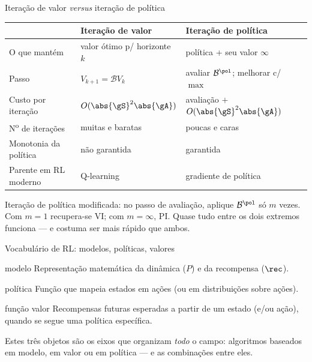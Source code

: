 \documentclass[aspectratio=169, 11pt]{beamer}
\newcommand{\Bop}{\mathcal{B}}                 %
\newcommand{\Bpol}{\mathcal{B}^{\pol}}         %
\begin{document}
\begin{frame}{Iteração de valor \emph{versus} iteração de política}
  \vspace{-0.3em}
  \begin{center}
  {\small
  \begin{tabular}{@{}p{3.4cm}p{4.6cm}p{4.6cm}@{}}
    \toprule
     & \textbf{Iteração de valor} & \textbf{Iteração de política} \\
    \midrule
    O que mantém & valor ótimo p/ horizonte $k$ & política + seu valor $\infty$ \\
    Passo & $V_{k+1} = \Bop V_k$ & avaliar $\Bpol$; melhorar c/ $\max$ \\
    Custo por iteração & $O(\abs{\gS}^2 \abs{\gA})$ & avaliação $+$ $O(\abs{\gS}^2 \abs{\gA})$ \\
    N\textsuperscript{o} de iterações & muitas e baratas & poucas e caras \\
    Monotonia da política & não garantida & \alert{garantida} \\
    Parente em RL moderno & Q-learning & gradiente de política \\
    \bottomrule
  \end{tabular}}
  \end{center}
  \vspace{-0.1em}
  \begin{ideiabox}
    \alert{Iteração de política modificada}: no passo de avaliação, aplique $\Bpol$ só
    $m$ vezes. Com $m=1$ recupera-se VI; com $m=\infty$, PI. Quase tudo entre os dois
    extremos funciona --- e costuma ser mais rápido que ambos.
  \end{ideiabox}
\end{frame}

\begin{frame}{Vocabulário de RL: modelos, políticas, valores}
  \begin{defbox}{modelo}
    Representação matemática da dinâmica ($P$) e da recompensa ($\rec$).
  \end{defbox}
  \begin{defbox}{política}
    Função que mapeia estados em ações (ou em distribuições sobre ações).
  \end{defbox}
  \begin{defbox}{função valor}
    Recompensas futuras esperadas a partir de um estado (e/ou ação), quando se segue uma
    política específica.
  \end{defbox}
  \begin{ideiabox}
    Estes três objetos são os eixos que organizam \emph{todo} o campo: algoritmos
    baseados em modelo, em valor ou em política --- e as combinações entre eles.
  \end{ideiabox}
\end{frame}
\end{document}

